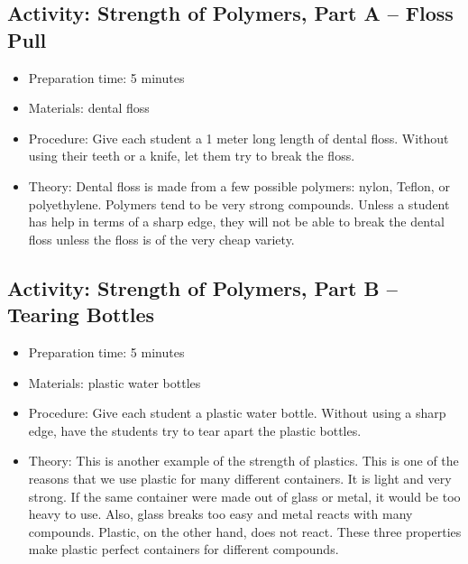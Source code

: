 \begin{itemize}
{\begin{itemize}
\begin{itemize}
{\subsection{Activity: Strength of Polymers, Part A – Floss Pull}
\begin{itemize}
\item{Preparation time: 5 minutes}
\item{Materials: dental floss}
\item{Procedure: Give each student a 1 meter long length of dental floss. Without using their teeth or a knife, let them try to break the floss.}
\item{Theory: Dental floss is made from a few possible polymers: nylon, Teflon, or polyethylene. Polymers tend to be very strong compounds. Unless a student has help in terms of a sharp edge, they will not be able to break the dental floss unless the floss is of the very cheap variety.}
\end{itemize}

\subsection{Activity: Strength of Polymers, Part B – Tearing Bottles}
\begin{itemize}
\item{Preparation time: 5 minutes}
\item{Materials: plastic water bottles}
\item{Procedure: Give each student a plastic water bottle. Without using a sharp edge, have the students try to tear apart the plastic bottles.}
\item{Theory: This is another example of the strength of plastics. This is one of the reasons that we use plastic for many different containers. It is light and very strong. If the same container were made out of glass or metal, it would be too heavy to use. Also, glass breaks too easy and metal reacts with many compounds. Plastic, on the other hand, does not react. These three properties make plastic perfect containers for different compounds. }
\end{itemize}

}
\end{itemize}
\end{itemize}}
\end{itemize}
